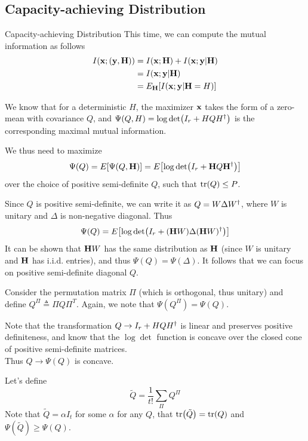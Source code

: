 \subsection{Capacity-achieving Distribution}
\begin{frame}[allowframebreaks]{Capacity-achieving Distribution}
This time, we can compute the mutual information as follows
\begin{align*}
\begin{split}
I(\vb{x;(y,H)}) &= I(\vb{x;H}) + I(\vb{x;y|H})\\
&= I(\vb{x;y|H})\\
&= \Exp[\vb{H}]{I(\vb{x;y|H}=H)}
\end{split}
\end{align*}

We know that for a deterministic $H$, the maximizer $\vb{x}$ takes the form of a zero-mean \cscg{} with covariance $Q$, and $\Psi(Q,H) = \log\det(I_r + HQ\herm{H})$ is the corresponding maximal mutual information.

\medskip
We thus need to maximize
$$\Psi(Q) = \Exp{\Psi(Q,\vb{H})} = \Exp{\log\det(I_r + \vb{H}Q\herm{\vb{H}})}$$
over the choice of positive semi-definite $Q$, such that $\tr(Q)\leq P$.

\framebreak

Since $Q$ is positive semi-definite, we can write it as $Q = W\Delta\herm{W}$, where $W$ is unitary and $\Delta$ is non-negative diagonal. Thus
$$\Psi(Q) = \Exp{\log\det(I_r + (\vb{H}W)\Delta\herm{(\vb{H}W)})}$$
It can be shown that $\vb{H}W$ has the same distribution as $\vb{H}$ (since $W$ is unitary and $\vb{H}$ has i.i.d. entries), and thus $\Psi(Q)=\Psi(\Delta)$. It follows that we can focus on positive semi-definite diagonal $Q$.

\medskip
Consider the permutation matrix $\Pi$ (which is orthogonal, thus unitary) and define $Q^\Pi \triangleq \Pi Q \Pi^T$. Again, we note that $\Psi(Q^\Pi) = \Psi(Q)$.

\framebreak

Note that the transformation $Q\rightarrow I_r+HQ\herm{H}$ is linear and preserves positive definiteness, and know that the $\log\det$ function is concave over the closed cone of positive semi-definite matrices.\\
Thus $Q\rightarrow \Psi(Q)$ is concave.

\medskip
Let's define
$$\tilde{Q} = \frac{1}{t!}\sum_\Pi Q^\Pi$$
Note that $\tilde{Q}=\alpha I_t$ for some $\alpha$ for any $Q$, that $\tr(\tilde{Q})=\tr(Q)$ and $\Psi(\tilde{Q})\geq\Psi(Q)$.


\end{frame}
